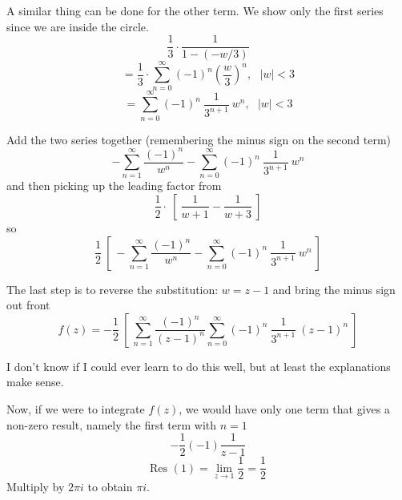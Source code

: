 \documentclass[11pt, oneside]{article}
\begin{document}
A similar thing can be done for the other term.  We show only the first series since we are inside the circle.
\[  \frac{1}{3} \cdot \frac{1}{1 - (-w/3)} \]
\[ = \frac{1}{3} \cdot  \sum_{n=0}^{\infty} (-1)^n (\frac{w}{3})^n , \ \ \ |w| < 3 \]
\[ = \sum_{n=0}^{\infty} (-1)^n \ \frac{1}{3^{n+1}} \ w^n , \ \ \ |w| < 3 \]

Add the two series together (remembering the minus sign on the second term)
\[ -\sum_{n=1}^{\infty} \frac{(-1)^n}{w^n} - \sum_{n=0}^{\infty} (-1)^n \ \frac{1}{3^{n+1}} \ w^n \]
and then picking up the leading factor from 
\[ \frac{1}{2} \cdot \ [ \ \frac{1}{w+1} - \frac{1}{w+3} \ ] \]
so
\[ \frac{1}{2} \ [ \ -\sum_{n=1}^{\infty} \frac{(-1)^n}{w^n} - \sum_{n=0}^{\infty} (-1)^n \ \frac{1}{3^{n+1}} \ w^n \ ] \]

The last step is to reverse the substitution:  $w = z - 1$ and bring the minus sign out front
\[ f(z) = - \frac{1}{2} \ [ \ \sum_{n=1}^{\infty} \frac{(-1)^n}{(z-1)^n} \sum_{n=0}^{\infty} (-1)^n \ \frac{1}{3^{n+1}} \ (z-1)^n \ ] \]

I don't know if I could ever learn to do this well, but at least the explanations make sense.

Now, if we were to integrate $f(z)$, we would have only one term that gives a non-zero result, namely the first term with $n=1$
\[ - \frac{1}{2} (-1) \frac{1}{z-1} \]
\[ \text{Res }(1) = \lim_{z \rightarrow 1} \frac{1}{2} = \frac{1}{2} \]
Multiply by $2 \pi i$ to obtain $\pi i$.
\end{document}
